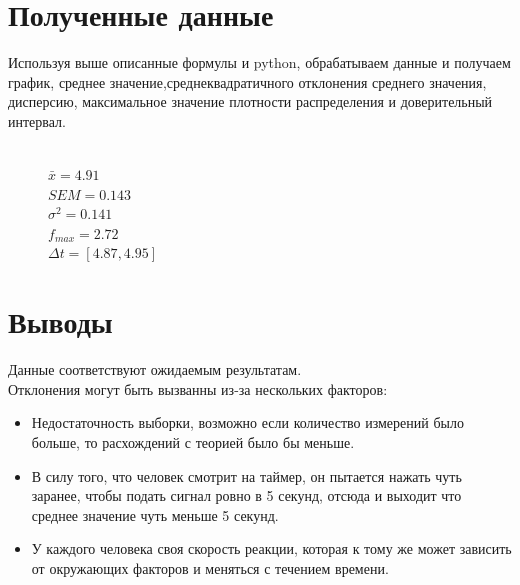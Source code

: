 \documentclass[a4paper]{article}
\begin{document}
\section{Полученные данные}
Используя выше описанные формулы и python, обрабатываем данные и получаем график, среднее значение,среднеквадратичного отклонения среднего значения, дисперсию, максимальное значение плотности распределения и доверительный интервал.
\begin{figure}[H]
	\\
	$\bar{x}=4.91$\\
	$SEM=0.143$\\
	$\sigma^2=0.141$\\
	$f_{max}=2.72$\\
	$\Delta{t}=[4.87, 4.95]$\\

\end{figure}



\section{Выводы}
Данные соответствуют ожидаемым результатам.\\Отклонения могут быть вызванны из-за нескольких факторов:
\begin{itemize}
	\item Недостаточность выборки, возможно если количество измерений было больше, то расхождений с теорией было бы меньше.
	\item В силу того, что человек смотрит на таймер, он пытается нажать чуть заранее, чтобы подать сигнал ровно в 5 секунд, отсюда и выходит что среднее значение чуть меньше 5 секунд.
	\item У каждого человека своя скорость реакции, которая к тому же может зависить от окружающих факторов и меняться с течением времени.
\end{itemize}
\end{document}

